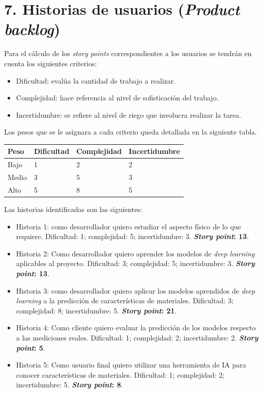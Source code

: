 \documentclass[
11pt, %
codirector, %
]{charter}
\begin{document}
\section{7. Historias de usuarios (\textit{Product backlog})}
\label{sec:backlog}




Para el cálculo de los \textit{story points} correspondientes a los
usuarios se tendrán en cuenta los siguientes criterios:

\begin{itemize}
	\item Dificultad: evalúa la cantidad de trabajo a realizar.
	\item Complejidad: hace referencia al nivel de sofisticación del trabajo.
	\item Incertidumbre: se refiere al nivel de riego que involucra realizar
	la tarea. 
\end{itemize}

Los pesos que se le asignara a cada criterio queda detallada en la siguiente tabla.


\begin{table}[H]
	\begin{tabularx}{\linewidth}{@{}|l|X|X|l|@{}}
	\hline
	\rowcolor[HTML]{C0C0C0} 
	Peso   & Dificultad & Complejidad 	& Incertidumbre 	\\ \hline
	Bajo   & 1      & 2	&  2   	\\ \hline
	Medio  & 3      & 5 &  3	\\ \hline
	Alto   & 5      & 8 &  5  	\\ \hline
	\end{tabularx}
\end{table}


Las historias identificadas son las siguientes:

\begin{itemize}
	\item Historia 1: como desarrollador quiero estudiar el aspecto físico
	de lo que requiere. Dificultad: 1; complejidad: 5; incertidumbre: 3.  \textbf{\textit{Story point}: 13}.
	\item Historia 2: Como desarrollador quiero aprender los modelos de \textit{deep learning} 
	aplicables al proyecto. Dificultad: 3; complejidad: 5; incertidumbre: 3.  \textbf{\textit{Story point}: 13}.
	\item Historia 3: como desarrollador quiero aplicar los modelos aprendidos de \textit{deep learning} 
	a la predicción de características de materiales.
	Dificultad: 3; complejidad: 8; incertidumbre: 5. \textbf{\textit{Story point}: 21}.
	\item Historia 4: Como cliente quiero evaluar la predicción de los modelos respecto
	a las mediciones reales. 
	Dificultad: 1; complejidad: 2; incertidumbre: 2. \textbf{\textit{Story point}: 5}.
	\item Historia 5: Como usuario final quiero utilizar una herramienta de IA para
	conocer características de materiales. 
	Dificultad: 1; complejidad: 2; incertidumbre: 5. \textbf{\textit{Story point}: 8}.
\end{itemize}
\end{document}

